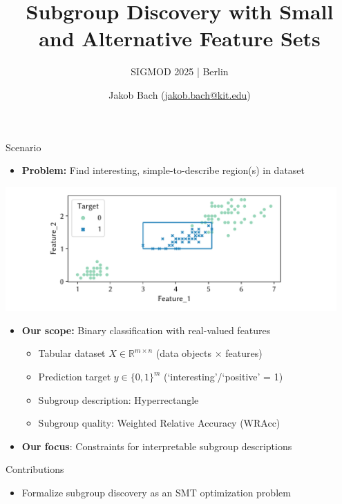 \documentclass[USenglish]{article} %
\title{\Huge\textcolor{KITgreen}{Subgroup Discovery with Small and Alternative Feature Sets}} %
\subtitle{SIGMOD 2025 | Berlin}
\author{\textcolor{KITgray}{Jakob Bach (\href{mailto:jakob.bach@kit.edu}{jakob.bach@kit.edu})}}
\institute{} %
\begin{document}
\maketitle

\begin{minipage}[t]{0.49\textwidth} %
	\vspace{0pt} %
	\begin{standardbox}{Scenario}
		\begin{itemize}
			\item \textbf{Problem:} Find interesting, simple-to-describe region(s) in dataset
		\end{itemize}
		\centering
		\includegraphics[width=0.95\textwidth, trim=70 10 90 10, clip]{plots/csd-exemplary-subgroup.pdf}
		\begin{itemize}
			\item \textbf{Our scope:} Binary classification with real-valued features
			\begin{itemize}
				\item Tabular dataset $X \in \mathbb{R}^{m \times n}$ (data objects $\times$ features)
				\item Prediction target $y \in \{0, 1\}^m$ (`interesting'/`positive' = 1)
				\item Subgroup description: Hyperrectangle
				\item Subgroup quality: Weighted Relative Accuracy (WRAcc)
			\end{itemize}
			\vspace{\baselineskip}
			\item \textbf{Our focus}: Constraints for interpretable subgroup descriptions
		\end{itemize}
	\end{standardbox}
	\vspace{10pt}
	\begin{standardbox}{Contributions}
		\begin{itemize}
			\item Formalize subgroup discovery as an SMT optimization problem

\end{itemize}
\end{standardbox}
\end{minipage}
\end{document}
